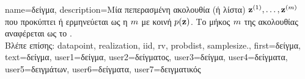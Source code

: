{name={\foreignlanguage{greek}{δείγμα}},
	description={\foreignlanguage{greek}{Μία} 
		\foreignlanguage{greek}{πεπερασμένη ακολουθία (ή λίστα)} \linebreak ${\bf z}^{(1)}, \ldots, {\bf z}^{(m)}$ 
		\foreignlanguage{greek}{που προκύπτει ή ερμηνεύεται ως η}  $m$    
		\foreignlanguage{greek}{με κοινή}  $p({\bf z})$. \foreignlanguage{greek}{Το μήκος $m$ της  
		ακολουθίας αναφέρεται ως το} .\\
		\foreignlanguage{greek}{Βλέπε επίσης:} \gls{datapoint}, \gls{realization}, \gls{iid}, \gls{rv}, \gls{probdist}, \gls{samplesize}.},
	first={\foreignlanguage{greek}{δείγμα}},
	text={\foreignlanguage{greek}{δείγμα}},
	user1={\foreignlanguage{greek}{δείγμα}}, %
	user2={\foreignlanguage{greek}{δείγματος}}, %
	user3={\foreignlanguage{greek}{δείγμα}}, %
	user4={\foreignlanguage{greek}{δείγματα}}, %
	user5={\foreignlanguage{greek}{δειγμάτων}}, %
	user6={\foreignlanguage{greek}{δείγματα}}, %
	user7={\foreignlanguage{greek}{δειγματικός}} %
}

